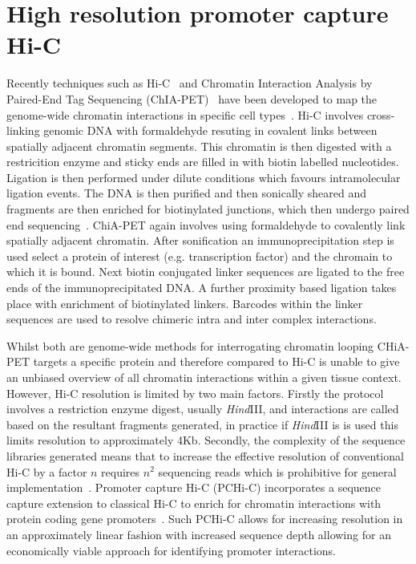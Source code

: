 \documentclass[a4paper,11pt]{report}
\begin{document}
\section{High resolution promoter capture Hi-C}
Recently techniques such as Hi-C~\citep{Lieberman-AidenvanBerkumWilliamsEtAl2009} and  Chromatin Interaction Analysis by Paired-End Tag Sequencing (ChIA-PET)~\citep{FullwoodLiuPanEtAl2009} have been developed to map the genome-wide chromatin interactions in specific cell types~\citep{RaoHuntleyDurandEtAl2014}. Hi-C involves cross-linking genomic DNA with formaldehyde resuting in covalent links between spatially adjacent chromatin segments. This chromatin is then digested with a restricition enzyme and sticky ends are filled in with biotin labelled nucleotides. Ligation is then performed under dilute conditions which favours intramolecular ligation events. The DNA is then purified and then sonically sheared and fragments are then enriched for biotinylated junctions, which then undergo paired end sequencing~\citep{vanBerkumLieberman-AidenWilliamsEtAl2010}. ChiA-PET again involves using formaldehyde to covalently link spatially adjacent chromatin. After sonification an immunoprecipitation step is used select a protein of interest (e.g. transcription factor) and the chromain to which it is bound. Next biotin conjugated linker sequences are ligated to the free ends of the immunoprecipitated DNA. A further proximity based ligation takes place with enrichment of biotinylated linkers. Barcodes within the linker sequences are used to resolve chimeric intra and inter complex interactions. 

Whilst both are genome-wide methods for interrogating chromatin looping CHiA-PET targets a specific protein and therefore compared to Hi-C is unable to give an unbiased overview of all chromatin interactions within a given tissue context. However, Hi-C resolution is limited by two main factors. Firstly the protocol involves a restriction enzyme digest, usually \textit{Hind}III, and interactions are called based on the resultant fragments generated, in practice if \textit{Hind}III is is used this limits resolution to approximately 4Kb. Secondly,  the complexity of the sequence libraries generated means that to increase the effective resolution of conventional Hi-C by a factor $n$ requires $n^{2}$ sequencing reads which is prohibitive for general implementation~\citep{JaegerMiglioriniHenrionEtAl2015}. Promoter capture Hi-C (PCHi-C) incorporates a sequence capture extension to classical Hi-C to enrich for chromatin interactions with protein coding gene promoters~\citep{Mifsud2015-fm}. Such PCHi-C allows for increasing resolution in an approximately linear fashion with increased sequence depth allowing for an economically viable approach for identifying promoter interactions. 
\end{document}

